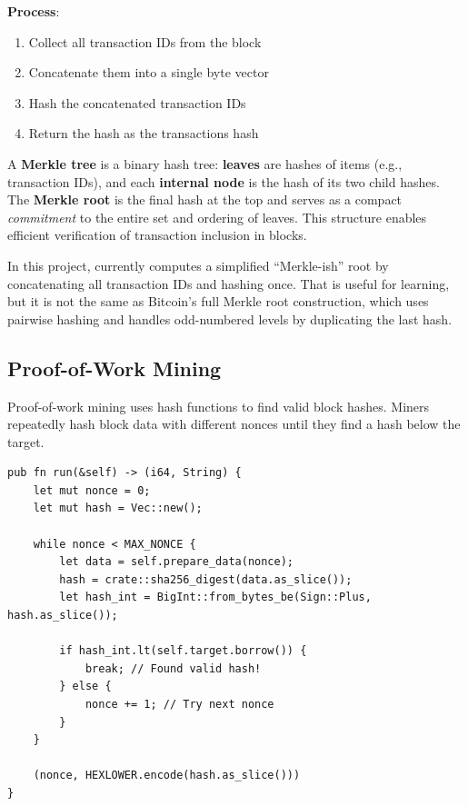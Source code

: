 \needspace{2in}
\textbf{Process}:
\begin{enumerate}
  \item Collect all transaction IDs from the block
  \item Concatenate them into a single byte vector
  \item Hash the concatenated transaction IDs
  \item Return the hash as the transactions hash
\end{enumerate}

A \textbf{Merkle tree} is a binary hash tree: \textbf{leaves} are hashes of items (e.g., transaction IDs), and each \textbf{internal node} is the hash of its two child hashes. The \textbf{Merkle root} is the final hash at the top and serves as a compact \emph{commitment} to the entire set and ordering of leaves. This structure enables efficient verification of transaction inclusion in blocks.

\begin{notebox}
In this project,  currently computes a simplified ``Merkle-ish'' root by concatenating all transaction IDs and hashing once. That is useful for learning, but it is not the same as Bitcoin's full Merkle root construction, which uses pairwise hashing and handles odd-numbered levels by duplicating the last hash.
\end{notebox}

\subsection{Proof-of-Work Mining}
\label{sec:ch08-pow-hashing}

Proof-of-work mining uses hash functions to find valid block hashes. Miners repeatedly hash block data with different nonces until they find a hash below the target.

\begin{listing}[htbp]
\caption{Proof-of-work mining loop ()}
\label{lst:ch08-pow-run}
\begin{verbatim}
pub fn run(&self) -> (i64, String) {
    let mut nonce = 0;
    let mut hash = Vec::new();

    while nonce < MAX_NONCE {
        let data = self.prepare_data(nonce);
        hash = crate::sha256_digest(data.as_slice());
        let hash_int = BigInt::from_bytes_be(Sign::Plus, hash.as_slice());

        if hash_int.lt(self.target.borrow()) {
            break; // Found valid hash!
        } else {
            nonce += 1; // Try next nonce
        }
    }

    (nonce, HEXLOWER.encode(hash.as_slice()))
}
\end{verbatim}
\end{listing}

